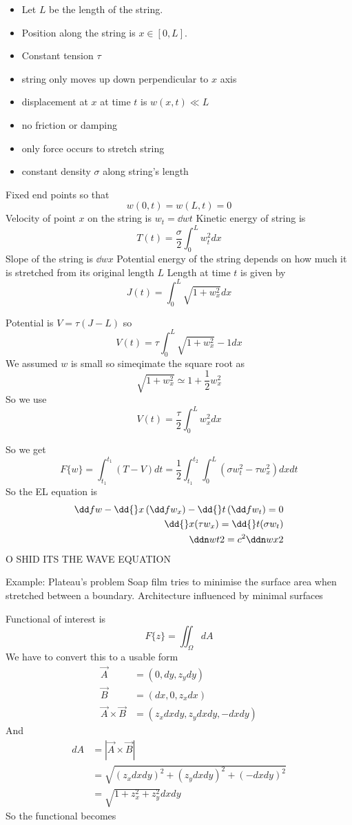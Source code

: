 \documentclass{X:/Documents/Coding/Latex/myassignment}
\begin{document}
\begin{itemize}
	\item Let $L$ be the length of the string.
	\item Position along the string is $x \in [0,L]$.
	\item Constant tension $\tau$
	\item string only moves up down perpendicular to $x$ axis
	\item displacement at $x$ at time $t$ is $w(x,t) \ll L$
	\item no friction or damping
	\item only force occurs to stretch string
	\item constant density $\sigma$ along string's length
\end{itemize}

Fixed end points so that
\[w(0,t) = w(L,t) = 0\]
Velocity of point $x$ on the string is $w_t = \dd wt$
Kinetic energy of string is
\[T(t) = \frac \sigma 2 \int_0^L w_t^2 dx\]
Slope of the string is $\dd wx$
Potential energy of the string depends on how much it is stretched from its original length $L$
Length at time $t$ is given by
\[J(t) = \int_0^L \sqrt{1 + w_x^2} dx\]

Potential is $V = \tau(J-L)$ so
\[V(t) = \tau \int_0^L \sqrt{1 + w_x^2} - 1 dx\]
We assumed $w$ is small so simeqimate the square root as
\[\sqrt{1+w_x^2} \simeq 1 + \frac12 w_x^2\]
So we use
\[V(t) = \frac{\tau}{2} \int_0^L w_x^2 dx\]


So we get
\[F\{w\} = \int_{t_1}^{t_1} \left(T-V\right) dt = \frac12 \int_{t_1}^{t_2} \int_0^L \left(\sigma w_t^2 - \tau w_x^2\right) dx dt\]
So the EL equation is
\begin{align*}
	\dd fw - \dd{}x\left(\dd f{w_x}\right) - \dd{}t \left(\dd f{w_t}\right) = 0\\
	\dd{}x (\tau w_x) = \dd{}t (\sigma w_t)\\
	\ddn wt2 = c^2 \ddn wx2
\end{align*}
O SHID ITS THE WAVE EQUATION






Example: Plateau's problem
Soap film tries to minimise the surface area when stretched between a boundary.
Architecture influenced by minimal surfaces

Functional of interest is
\[F\{z\} = \iint_{\Omega} dA\]
We have to convert this to a usable form
\begin{align*}
	\vec A &= (0,dy,z_ydy)\\
	\vec B &= (dx,0,z_x dx)\\
	\vec A\times \vec B &= (z_x dxdy, z_y dxdy, -dxdy)
\end{align*}
And
\begin{align*}
	dA &= |\vec A\times \vec B| \\
	&=	\sqrt{(z_xdxdy)^2 + (z_ydxdy)^2 + (-dxdy)^2}\\
	&= \sqrt{1+ z_x^2 + z_y^2} dxdy
\end{align*}
So the functional becomes
\end{document}

